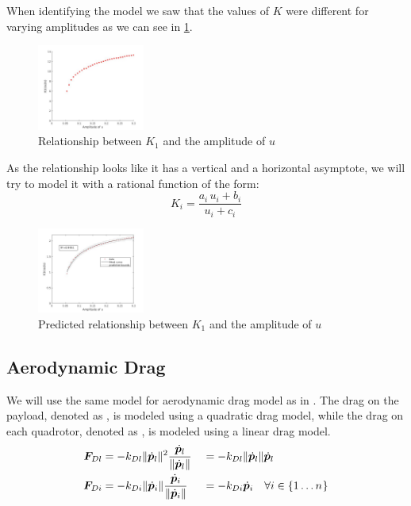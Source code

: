 When identifying the model we saw that the values of $K$ were different for varying amplitudes as we can see in \cref{fig:K_u}.

\begin{figure}[h]
	\centering
	\includegraphics[width=0.31415\textwidth]{Figures/K_u}
	\caption{Relationship between $K_1$ and the amplitude of $u$}
	\label{fig:K_u}
\end{figure}


As the relationship looks like it has a vertical and a horizontal asymptote, we will try to model it with a rational function of the form:
\begin{equation}
K_i=\frac{a_i\,u_i+b_i}{u_i+c_i}
\end{equation}

\begin{figure}[h]
	\centering
	\includegraphics[width=0.31415\textwidth]{Figures/K_u_pred}
	\caption{Predicted relationship between $K_1$ and the amplitude of $u$}
	\label{fig:K_u_pred}
\end{figure}






\subsection{Aerodynamic Drag}
We will use the same model for aerodynamic drag model as in \cite{Potdar2018}. The drag on the payload, denoted as , is modeled using a quadratic drag model, while the drag on each quadrotor, denoted as , is modeled using a linear drag model.
\begin{alignat}{2}
\bm{F}_{Dl} &= 
-k_{Dl}\|\dot{\bm{p}}_l\|^2\frac{\dot{\bm{p}}_l}{\|\dot{\bm{p}}_l\|} &&= 
-k_{Dl}\|\dot{\bm{p}}_l\|\dot{\bm{p}}_l
\label{eq::dragl}
\\
\bm{F}_{Di} &= 
-k_{Di}\|\dot{\bm{p}}_i\|\frac{\dot{\bm{p}}_i}{\|\dot{\bm{p}}_i\|} &&= 
-k_{Di}\dot{\bm{p}}_i \quad\forall i \in \{1\dots n_{}\}
\label{eq::dragi}
\end{alignat}

